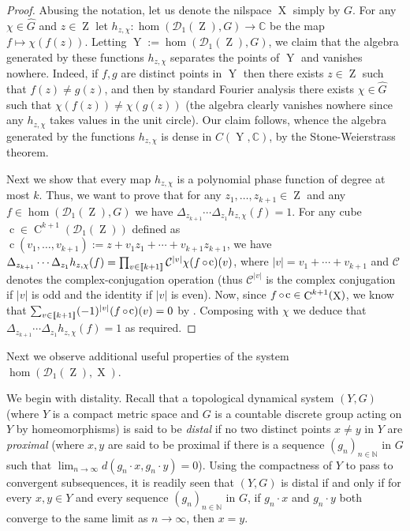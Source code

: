 \documentclass[a4paper,12pt,reqno]{amsart}
\theoremstyle{definition}
\newcommand{\mc}{\mathcal}
\newcommand{\mb}{\mathbb}
\DeclareMathOperator{\ab}{Z}
\DeclareMathOperator{\q}{c}
\DeclareMathOperator{\ns}{X}
\DeclareMathOperator{\nss}{Y}
\DeclareMathOperator{\co}{\circ\hspace{-0.02 cm}}
\DeclareMathOperator{\cu}{C}
\newcommand*{\db}[1]{\llbracket #1\rrbracket}
\begin{document}
\begin{proof}
Abusing the notation, let us denote the nilspace $\ns$ simply by $G$. For any $\chi\in \widehat{G}$ and $z\in \ab$ let $h_{z,\chi}:\hom(\mc{D}_1(\ab),G) \to \mb{C}$ be the map $f\mapsto \chi(f(z))$. Letting $\nss:=\hom(\mc{D}_1(\ab),G)$, we claim that the algebra generated by these functions $h_{z,\chi}$ separates the points of $\nss$ and vanishes nowhere. Indeed, if $f,g$ are distinct points in $\nss$ then there exists $z\in \ab$ such that $f(z)\not=g(z)$, and then by standard Fourier analysis there exists $\chi\in \widehat{G}$ such that $\chi(f(z))\neq \chi(g(z))$ (the algebra clearly vanishes nowhere since any $h_{z,\chi}$ takes values in the unit circle). Our claim follows, whence the algebra generated by the functions $h_{z,\chi}$ is dense in $C(\nss,\mb{C})$, by the Stone-Weierstrass theorem.

Next we show that every map $h_{z,\chi}$ is a polynomial phase function of degree at most $k$. Thus, we want to prove that for any  $z_1,\ldots,z_{k+1}\in \ab$ and any $f\in \hom(\mc{D}_1(\ab),G)$ we have $\Delta_{z_{k+1}}\cdots\Delta_{z_1}h_{z,\chi}(f)=1$.  For any cube $\q\in \cu^{k+1}(\mc{D}_1(\ab))$ defined as $\q(v_1,\ldots,v_{k+1}):=z+v_1z_1+\cdots+v_{k+1}z_{k+1}$, we have $\Delta_{z_{k+1}}\cdots\Delta_{z_1}h_{z,\chi}(f) = \prod_{v\in \db{k+1}} \mc{C}^{|v|}\chi(f\co \q)(v)$, where $|v|=v_1+\cdots+v_{k+1}$ and $\mc{C}$ denotes the complex-conjugation operation (thus $\mc{C}^{|v|}$ is the complex conjugation if $|v|$ is odd and the identity if $|v|$ is even). Now, since  $f\co\q\in \cu^{k+1}(\ns)$,  we know that $\sum_{v\in \db{k+1}} (-1)^{|v|}(f\co \q)(v)=0$ by \cite[Proposition 2.2.28]{Cand:Notes1}. Composing with $\chi$ we deduce that $\Delta_{z_{k+1}}\cdots\Delta_{z_1}h_{z,\chi}(f)=1$ as required.
\end{proof}

\noindent Next we observe additional useful properties of the system $\hom(\mc{D}_1(\ab),\ns)$.

We begin with distality. Recall that a topological dynamical system $(Y,G)$ (where $Y$ is a compact metric space and $G$ is a countable discrete group acting on $Y$ by homeomorphisms) is said to be  \emph{distal} if no two distinct points $x \neq y$ in $Y$ are \emph{proximal} (where $x, y$ are said to be proximal if there is a sequence $(g_n)_{n\in \mb{N}}$ in $G$ such that $\lim_{n \to \infty} d(g_n\cdot x, g_n\cdot y) = 0$). Using the compactness of $Y$ to pass to convergent subsequences, it is readily seen that $(Y,G)$ is distal if and only if for every $x,y\in Y$ and every sequence $(g_n)_{n\in \mb{N}}$ in $G$, if   $g_n\cdot x$ and $g_n\cdot y$ both converge to the same limit as $n\to\infty$, then $x=y$.
\end{document}
